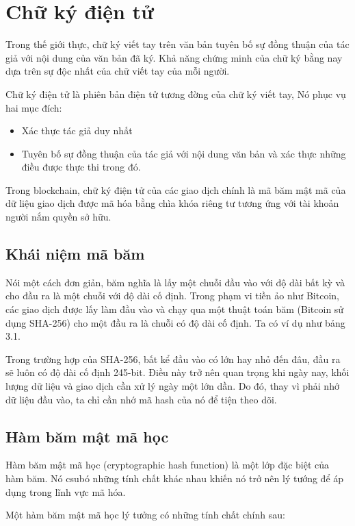{\section{Chữ ký điện tử}

Trong thế giới thực, chữ ký viết tay trên văn bản tuyên bố sự đồng thuận của tác giả với nội dung của văn bản đã ký. Khả năng chứng minh của chữ ký bằng nay dựa trên sự độc nhất của chữ  viết tay của mỗi người.

Chữ ký điện tử là phiên bản điện tử tương đờng của chữ ký viết tay, Nó phục vụ hai mục đích:
\begin{itemize}
	\item Xác thực tác giả duy nhất
	\item Tuyên bố sự đồng thuận của tác giả với nội dung văn bản và xác thực những điều được thực thi trong đó.
\end{itemize}

Trong blockchain, chữ ký điện tử của các giao dịch chính là mã băm mật mã của dữ liệu giao dịch được mã hóa bằng chìa khóa riêng tư tương ứng với tài khoản người nắm quyền sở hữu. 


\subsection{Khái niệm mã băm}
Nói một cách đơn giản, băm nghĩa là lấy một chuỗi đầu vào với độ dài bất kỳ và cho đầu ra là một chuỗi với độ dài cố định. Trong phạm vi tiền ảo như Bitcoin, các giao dịch được lấy làm đầu vào và chạy qua một thuật toán băm (Bitcoin sử dụng SHA-256) cho một đầu ra là chuỗi có độ dài cố định.
Ta có ví dụ như bảng 3.1. 

Trong trường hợp của SHA-256, bất kể đầu vào có lớn hay nhỏ đến đâu, đầu ra sẽ luôn có độ dài cố định 245-bit. Điều này trở nên quan trọng khi ngày nay, khối lượng dữ liệu và giao dịch cần xử lý ngày một lớn dần. Do đó, thay vì phải nhớ dữ liệu đầu vào, ta chỉ cần nhớ mã hash của nó để tiện theo dõi.

\subsection{Hàm băm mật mã học}
Hàm băm mật mã học (cryptographic hash function) là một lớp đặc biệt của hàm băm. Nó csubó những tính chất khác nhau khiến nó trở nên lý tướng để áp dụng trong lĩnh vực mã hóa.  

Một hàm băm mật mã học lý tưởng có những tính chất chính sau:


}
